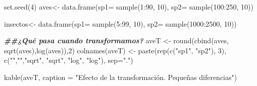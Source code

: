 \documentclass[
]{article}
\newenvironment{Shaded}{\begin{snugshade}}{\end{snugshade}}
\newcommand{\AttributeTok}[1]{\textcolor[rgb]{0.77,0.63,0.00}{#1}}
\newcommand{\DecValTok}[1]{\textcolor[rgb]{0.00,0.00,0.81}{#1}}
\newcommand{\DocumentationTok}[1]{\textcolor[rgb]{0.56,0.35,0.01}{\textbf{\textit{#1}}}}
\newcommand{\FunctionTok}[1]{\textcolor[rgb]{0.00,0.00,0.00}{#1}}
\newcommand{\NormalTok}[1]{#1}
\newcommand{\OtherTok}[1]{\textcolor[rgb]{0.56,0.35,0.01}{#1}}
\newcommand{\SpecialCharTok}[1]{\textcolor[rgb]{0.00,0.00,0.00}{#1}}
\newcommand{\StringTok}[1]{\textcolor[rgb]{0.31,0.60,0.02}{#1}}
\begin{document}
\begin{Shaded}
\begin{Highlighting}[]
\FunctionTok{set.seed}\NormalTok{(}\DecValTok{4}\NormalTok{)}
\NormalTok{aves}\OtherTok{\textless{}{-}} \FunctionTok{data.frame}\NormalTok{(}\AttributeTok{sp1=} \FunctionTok{sample}\NormalTok{(}\DecValTok{1}\SpecialCharTok{:}\DecValTok{90}\NormalTok{, }\DecValTok{10}\NormalTok{), }\AttributeTok{sp2=} \FunctionTok{sample}\NormalTok{(}\DecValTok{100}\SpecialCharTok{:}\DecValTok{250}\NormalTok{, }\DecValTok{10}\NormalTok{))}

\NormalTok{insectos}\OtherTok{\textless{}{-}} \FunctionTok{data.frame}\NormalTok{(}\AttributeTok{sp1=} \FunctionTok{sample}\NormalTok{(}\DecValTok{5}\SpecialCharTok{:}\DecValTok{99}\NormalTok{, }\DecValTok{10}\NormalTok{), }\AttributeTok{sp2=} \FunctionTok{sample}\NormalTok{(}\DecValTok{1000}\SpecialCharTok{:}\DecValTok{2500}\NormalTok{, }\DecValTok{10}\NormalTok{))}

\DocumentationTok{\#\#¿Qué pasa cuando transformamos?}
\NormalTok{aveT }\OtherTok{\textless{}{-}} \FunctionTok{round}\NormalTok{(}\FunctionTok{cbind}\NormalTok{(aves, }\FunctionTok{sqrt}\NormalTok{(aves),}\FunctionTok{log}\NormalTok{(aves)),}\DecValTok{2}\NormalTok{)}
\FunctionTok{colnames}\NormalTok{(aveT) }\OtherTok{\textless{}{-}} \FunctionTok{paste}\NormalTok{(}\FunctionTok{rep}\NormalTok{(}\FunctionTok{c}\NormalTok{(}\StringTok{"sp1"}\NormalTok{, }\StringTok{"sp2"}\NormalTok{), }\DecValTok{3}\NormalTok{), }\FunctionTok{c}\NormalTok{(}\StringTok{""}\NormalTok{,}\StringTok{""}\NormalTok{,}\StringTok{"sqrt"}\NormalTok{, }\StringTok{"sqrt"}\NormalTok{, }\StringTok{"log"}\NormalTok{, }\StringTok{"log"}\NormalTok{), }\AttributeTok{sep=}\StringTok{"."}\NormalTok{)}

\FunctionTok{kable}\NormalTok{(aveT, }\AttributeTok{caption =} \StringTok{"Efecto de la transformación. Pequeñas diferencias"}\NormalTok{)}
\end{Highlighting}
\end{Shaded}
\end{document}

